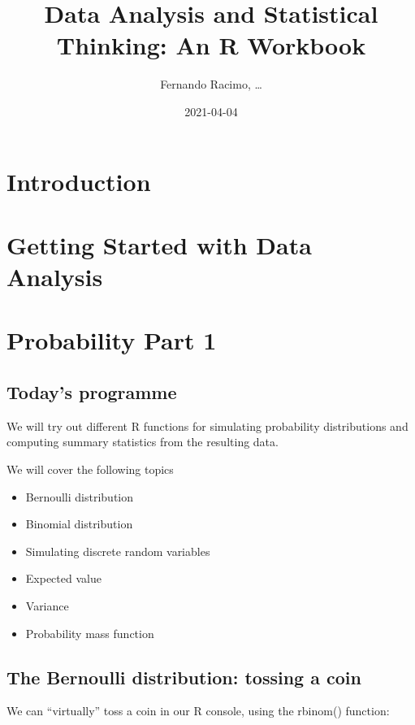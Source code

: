 \documentclass[
]{book}
\title{Data Analysis and Statistical Thinking: An R Workbook}
\author{Fernando Racimo, \ldots{}}
\date{2021-04-04}
\providecommand{\tightlist}{%
  \setlength{\itemsep}{0pt}\setlength{\parskip}{0pt}}
\begin{document}
\maketitle

{
\setcounter{tocdepth}{1}
\tableofcontents
}
\hypertarget{introduction}{%
\chapter{Introduction}\label{introduction}}

\hypertarget{intro}{%
\chapter{Getting Started with Data Analysis}\label{intro}}

\hypertarget{prob1}{%
\chapter{Probability Part 1}\label{prob1}}

\hypertarget{todays-programme}{%
\section{Today's programme}\label{todays-programme}}

We will try out different R functions for simulating probability distributions and computing summary statistics from the resulting data.

We will cover the following topics

\begin{itemize}
\tightlist
\item
  Bernoulli distribution
\item
  Binomial distribution
\item
  Simulating discrete random variables
\item
  Expected value
\item
  Variance
\item
  Probability mass function
\end{itemize}

\hypertarget{the-bernoulli-distribution-tossing-a-coin}{%
\section{The Bernoulli distribution: tossing a coin}\label{the-bernoulli-distribution-tossing-a-coin}}

We can ``virtually'' toss a coin in our R console, using the rbinom() function:
\end{document}
